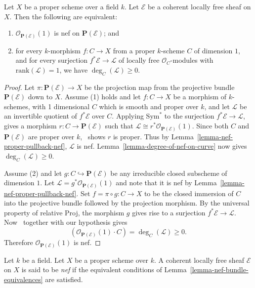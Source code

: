 \begin{lemma}
\label{lemma-nef-bundle-equivalences}
Let $X$ be a proper scheme over a field $k$.
Let $\mathcal{E}$ be a coherent locally free sheaf on $X$.
Then the following are equivalent:
\begin{enumerate}
\item $\mathcal{O}_{\mathbf{P}(\mathcal{E})}(1)$ is nef on
  $\mathbf{P}(\mathcal{E})$; and
\item for every $k$-morphism $f : C \to X$ from a proper $k$-scheme $C$
of dimension $1$, and for every surjection $f^*\mathcal{E} \to \mathcal{L}$
of locally free $\mathcal{O}_C$-modules with $\mathrm{rank}(\mathcal{L}) = 1$,
we have $\deg_C(\mathcal{L}) \geq 0$.
\end{enumerate}
\end{lemma}

\begin{proof}
Let $\pi : \mathbf{P}(\mathcal{E}) \to X$ be the projection map from the
projective bundle $\mathbf{P}(\mathcal{E})$ down to $X$.
Assume (1) holds and let $f : C \to X$ be a morphism of $k$-schemes, with
1 dimensional $C$ which is smooth and proper over $k$, and let $\mathcal{L}$
be an invertible quotient of $f^*\mathcal{E}$ over $C$.
Applying $\mathrm{Sym}^*$ to the surjection $f^*\mathcal{E} \to \mathcal{L}$,
 gives a morphism $r : C \to \mathbf{P}(\mathcal{E})$ such that
$\mathcal{L} \cong r^*\mathcal{O}_{\mathbf{P}(\mathcal{E})}(1)$.
Since both $C$ and $\mathbf{P}(\mathcal{E})$ are proper over $k$,~
shows $r$ is proper.
Thus by Lemma~\ref{lemma-nef-proper-pullback-nef}, $\mathcal{L}$ is nef.
Lemma~\ref{lemma-degree-of-nef-on-curve} now gives $\deg_C(\mathcal{L}) \geq 0$.

Assume (2) and let $g : C \hookrightarrow \mathbf{P}(\mathcal{E})$ be
any irreducible closed subscheme of dimension $1$.
Let $\mathcal{L} = g^*\mathcal{O}_{\mathbf{P}(\mathcal{E})}(1)$ and note
that it is nef by Lemma~\ref{lemma-nef-proper-pullback-nef}.
Set $f = \pi \circ g: C \to X$ to be the closed immersion of $C$ into the
projective bundle followed by the projection morphism.
By the universal property of relative Proj, the morphism $g$ gives rise
to a surjection $f^*\mathcal{E} \to \mathcal{L}$.
Now~ together with our hypothesis gives
$$
(\mathcal{O}_{\mathbf{P}(\mathcal{E})}(1) \cdot C) = \deg_C(\mathcal{L}) \geq 0.
$$
Therefore $\mathcal{O}_{\mathbf{P}(\mathcal{E})}(1)$ is nef.
\end{proof}

\begin{definition}
\label{definition-nef-bundle}
Let $k$ be a field.
Let $X$ be a proper scheme over $k$.
A coherent locally free sheaf $\mathcal{E}$ on $X$ is said to be \textit{nef}
if the equivalent conditions of Lemma~\ref{lemma-nef-bundle-equivalences} are
satisfied.
\end{definition}

